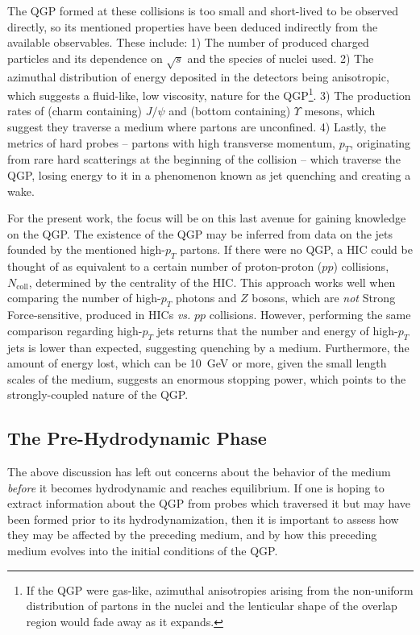 The \gls{QGP} formed at these collisions is too small and short-lived to be observed directly, so its mentioned properties have been deduced indirectly from the available observables. These include: 1) The number of produced charged particles and its dependence on $\sqrt{s}$ and the species of nuclei used. 2) The azimuthal distribution of energy deposited in the detectors being anisotropic, which suggests a fluid-like, low viscosity, nature for the \gls{QGP}\footnote{If the QGP were gas-like, azimuthal anisotropies arising from the non-uniform distribution of partons in the nuclei and the lenticular shape of the overlap region would fade away as it expands.}. 3) The production rates of (charm containing) $J/\psi$ and (bottom containing) $\Upsilon$ mesons, which suggest they traverse a medium where partons are unconfined. 4) Lastly, the metrics of hard probes -- partons with high transverse momentum, $p_T$, originating from rare hard scatterings at the beginning of the collision -- which traverse the QGP, losing energy to it in a phenomenon known as jet quenching and creating a wake. \cite{Busza_big_picture_2018}

For the present work, the focus will be on this last avenue for gaining knowledge on the \gls{QGP}. The existence of the \gls{QGP} may be inferred from data on the jets founded by the mentioned high-$p_T$ partons. If there were no \gls{QGP}, a \gls{HIC} could be thought of as equivalent to a certain number of proton-proton ($pp$) collisions, $N_\text{coll}$, determined by the centrality of the \gls{HIC}. This approach works well when comparing the number of \mbox{high-$p_T$} photons and $Z$ bosons, which are \textit{not} Strong Force-sensitive, produced in \glspl{HIC} \textit{vs.} $pp$ collisions. However, performing the same comparison regarding high-$p_T$ jets returns that the number and energy of high-$p_T$ jets is lower than expected, suggesting quenching by a medium. Furthermore, the amount of energy lost, which can be \qty{10}{GeV} or more, given the small length scales of the medium, suggests an enormous stopping power, which points to the strongly-coupled nature of the \gls{QGP}.  \cite{Busza_big_picture_2018} 



\subsection{The Pre-Hydrodynamic Phase}

The above discussion has left out concerns about the behavior of the medium \textit{before} it becomes hydrodynamic and reaches equilibrium. If one is hoping to extract information about the \gls{QGP} from probes which traversed it but may have been formed prior to its hydrodynamization, then it is important to assess how they may be affected by the preceding medium, and by how this preceding medium evolves into the initial conditions of the \gls{QGP}.

